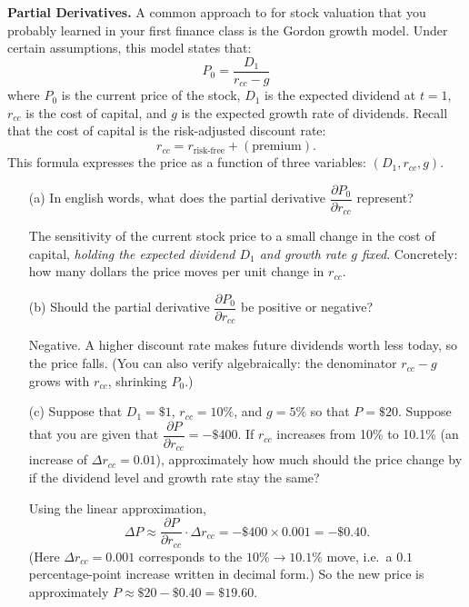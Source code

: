 \documentclass[11pt]{article}
\begin{document}
\textbf{Partial Derivatives.} A common approach to for stock valuation
that you probably learned in your first finance class is the Gordon
growth model. Under certain assumptions, this model states that:
\begin{equation*}
  P_0 = \frac{D_1}{r_{cc} - g}
\end{equation*}
where $P_0$ is the current price of the stock, $D_1$ is the expected
dividend at $t = 1$, $r_{cc}$ is the cost of capital, and $g$ is the
expected growth rate of dividends. Recall that the cost of capital is
the risk-adjusted discount rate:
\begin{equation*}
  r_{cc} = r_{\text{risk-free}} + (\text{premium}).
\end{equation*}
This formula expresses the price as a function of three variables:
$(D_1, r_{cc}, g)$.

\begin{enumerate}
  \item[(a)] In english words, what does the partial derivative
  $\dfrac{\partial P_0}{\partial r_{cc}}$ represent?
  \begin{solution}
  The sensitivity of the current stock price to a small change in the
  cost of capital, \emph{holding the expected dividend $D_1$ and growth
  rate $g$ fixed}. Concretely: how many dollars the price moves per unit
  change in $r_{cc}$.
  \end{solution}

  \item[(b)] Should the partial derivative $\dfrac{\partial P_0}{\partial r_{cc}}$
  be positive or negative?
  \begin{solution}
  Negative. A higher discount rate makes future dividends worth less
  today, so the price falls. (You can also verify algebraically: the
  denominator $r_{cc} - g$ grows with $r_{cc}$, shrinking $P_0$.)
  \end{solution}

  \item[(c)] Suppose that $D_1 = \$1$, $r_{cc} = 10\%$, and $g = 5\%$ so
  that $P = \$20$. Suppose that you are given that
  $\dfrac{\partial P}{\partial r_{cc}} = -\$400$. If $r_{cc}$ increases
  from 10\% to 10.1\% (an increase of $\Delta r_{cc} = 0.01$),
  approximately how much should the price change by if the dividend
  level and growth rate stay the same?
  \begin{solution}
  Using the linear approximation,
  \begin{equation*}
    \Delta P \approx \frac{\partial P}{\partial r_{cc}} \cdot \Delta r_{cc}
             = -\$400 \times 0.001 = -\$0.40.
  \end{equation*}
  (Here $\Delta r_{cc} = 0.001$ corresponds to the $10\% \to 10.1\%$
  move, i.e.\ a $0.1$ percentage-point increase written in decimal
  form.) So the new price is approximately $P \approx \$20 - \$0.40
  = \boxed{\$19.60}$.
  \end{solution}
\end{enumerate}
\end{document}
